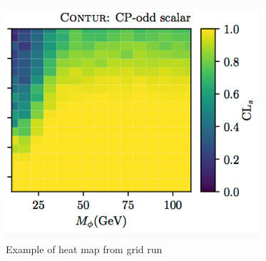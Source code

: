 \begin{figure}[H]
\centering
\includegraphics[scale=1]{plots/example_heatmap.png}
\caption{Example of heat map from grid run}
\label{fig:example_heatmap}
\end{figure}
